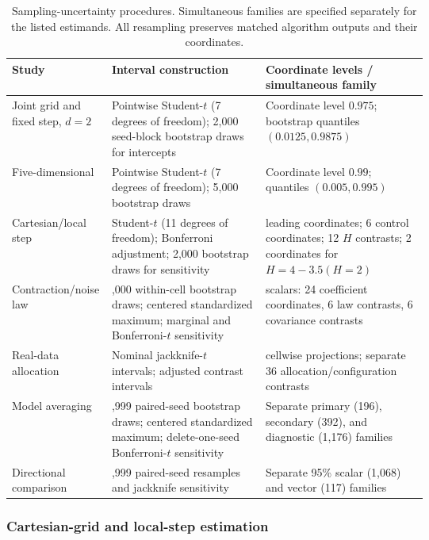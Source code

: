 \begin{table}[tbp]
\centering\small
\setlength{\tabcolsep}{4pt}
\caption{Sampling-uncertainty procedures. Simultaneous families are
specified separately for the listed estimands. All resampling preserves
matched algorithm outputs and their coordinates.}
\label{tab:num-inference}
\begin{tabularx}{\linewidth}{@{}>{\raggedright\arraybackslash}p{0.24\linewidth}
>{\raggedright\arraybackslash}p{0.37\linewidth}>{\raggedright\arraybackslash}X@{}}
\toprule
Study & Interval construction & Coordinate levels / simultaneous family \\
\midrule
Joint grid and fixed step, $d=2$ &
Pointwise Student-$t$ (7 degrees of freedom); 2,000 seed-block bootstrap draws for intercepts &
Coordinate level $0.975$; bootstrap quantiles $(0.0125,0.9875)$ \\
Five-dimensional &
Pointwise Student-$t$ (7 degrees of freedom); 5,000 bootstrap draws &
Coordinate level $0.99$; quantiles $(0.005,0.995)$ \\
Cartesian/local step &
Student-$t$ (11 degrees of freedom); Bonferroni adjustment; 2,000 bootstrap draws for sensitivity &
16 leading coordinates; 6 control coordinates; 12 $H$ contrasts; 2 coordinates for $H=4-3.5(H=2)$ \\
Contraction/noise law &
4,000 within-cell bootstrap draws; centered standardized maximum; marginal and Bonferroni-$t$ sensitivity &
36 scalars: 24 coefficient coordinates, 6 law contrasts, 6 covariance contrasts \\
Real-data allocation &
Nominal jackknife-$t$ intervals; adjusted contrast intervals &
105 cellwise projections; separate 36 allocation/configuration contrasts \\
Model averaging &
19,999 paired-seed bootstrap draws; centered standardized maximum; delete-one-seed Bonferroni-$t$ sensitivity &
Separate primary (196), secondary (392), and diagnostic (1,176) families \\
Directional comparison &
19,999 paired-seed resamples and jackknife sensitivity &
Separate 95\% scalar (1,068) and vector (117) families \\
\bottomrule
\end{tabularx}
\end{table}

\subsubsection{Cartesian-grid and local-step estimation}
\label{app:num-cartesian-protocol}

